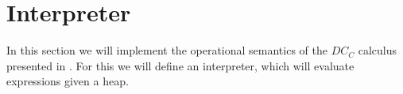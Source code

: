 \section{Interpreter}
In this section we will implement
the operational semantics of the $DC_C$ calculus
presented in .
For this we will define an interpreter,
which will evaluate expressions given a heap.

